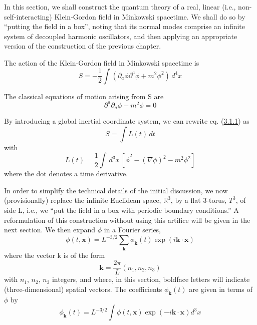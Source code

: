 \documentclass[11pt,a4paper]{article}
\begin{document}
In this section, we shall construct the quantum theory of a real, linear (i.e., non-self-interacting) Klein-Gordon field in \hypertarget{source-45}{} Minkowski spacetime. We shall do so by ``putting the field in a box'', noting that its normal modes comprise an infinite system of decoupled harmonic oscillators, and then applying an appropriate version of the construction of the previous chapter.

The action of the Klein-Gordon field in Minkowski spacetime is
\begin{equation*}
S = -\frac{1}{2} \int (\partial_a \phi \partial^a \phi + m^2 \phi^2) \,d^4 x \tag{3.1.1}\label{eq:3.1.1}
\end{equation*}

The classical equations of motion arising from S are
\begin{equation*}
\partial^{a}\partial_{a}\phi - m^{2}\phi = 0 \tag{3.1.2}\label{eq:3.1.2}
\end{equation*}

By introducing a global inertial coordinate system, we can rewrite eq. (\hyperref[eq:3.1.1]{3.1.1}) as
\begin{equation*}
S=\int L(t)\,dt \tag{3.1.3}\label{eq:3.1.3}
\end{equation*}
with
\begin{equation*}
L(t)=\frac12\int\,d^3x\,[\dot\phi^{2}-(\nabla\phi)^2-m^2\phi^2] \tag{3.1.4}\label{eq:3.1.4}
\end{equation*}
where the dot denotes a time derivative.

In order to simplify the technical details of the initial discussion, we now (provisionally) replace the infinite Euclidean space, \(\mathbb{R}^3\), by a flat 3-torus, \(T^3\), of side L, i.e., we ``put the field in a box with periodic boundary conditions.'' A reformulation of this construction without using this artifice will be given in the next section. We then expand \(\phi\) in a Fourier series,
\begin{equation*}
\phi(t,\mathbf{x}) = L^{-3/2} \sum_{\mathbf{k}} \phi_{\mathbf{k}}(t) \exp(i\mathbf{k} \cdot \mathbf{x}) \tag{3.1.5}\label{eq:3.1.5}
\end{equation*}
where the vector k is of the form
\begin{equation*}
\mathbf{k} = \frac{2\pi}{L} (n_1, n_2, n_3) \tag{3.1.6}\label{eq:3.1.6}
\end{equation*}
with \(n_1\), \(n_2\), \(n_3\) integers, and where, in this section, boldface letters will indicate (three-dimensional) spatial vectors. The coefficients \(\phi_\mathbf{k}(t)\) are given in terms of \(\phi\) by
\begin{equation*}
\phi_{\mathbf{k}}(t) = L^{-3/2} \int \phi(t, \mathbf{x}) \exp(-i\mathbf{k} \cdot \mathbf{x}) d^3x \tag{3.1.7}\label{eq:3.1.7}
\end{equation*}
\end{document}
